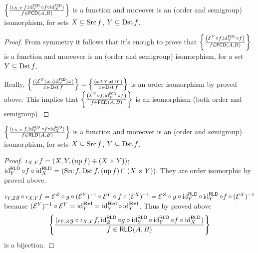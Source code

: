 \begin{prop}
  $\left\{ \frac{ (\iota_{X, Y} f , \operatorname{id}^{\mathsf{FCD}}_Y
  \circ f \circ \operatorname{id}^{\mathsf{FCD}}_X) }{
  f \in \mathsf{FCD} (A , B) }\right\}$ is a function and moreover is an
  (order and semigroup) isomorphism, for sets $X \subseteq \operatorname{Src} f$, $Y
  \subseteq \operatorname{Dst} f$.
\end{prop}

\begin{proof}
  From symmetry it follows that it's enough to prove that $\left\{ \frac{ \left(
  \mathcal{E}^Y \circ f , \operatorname{id}^{\mathsf{FCD}}_Y \circ f \right)
  }{ f \in \mathsf{FCD} (A , B) }\right\}$ is a
  function and moreover is an (order and semigroup) isomorphism, for a set $Y
  \subseteq \operatorname{Dst} f$.
  
  Really, $\left\{ \frac{ (\langle \mathcal{E}^Y \rangle x , \langle
  \operatorname{id}^{\mathsf{FCD}}_Y \rangle x) }{ x
  \in \operatorname{Dst} f }\right\} = \left\{ \frac{ (x \div Y , x \sqcap Y) }{
  x \in \operatorname{Dst} f }\right\}$ is an order isomorphism by proved
  above. This implies that $\left\{ \frac{ \left( \mathcal{E}^Y \circ f ,
  \operatorname{id}^{\mathsf{FCD}}_Y \circ f \right) }{
  f \in \mathsf{FCD} (A , B) }\right\}$ is an isomorphism
  (both order and semigroup).
\end{proof}

\begin{prop}
  $\left\{ \frac{ (\iota_{X, Y} f , \operatorname{id}^{\mathsf{RLD}}_Y \circ f \circ
  \operatorname{id}^{\mathsf{RLD}}_X) }{ f \in
  \mathsf{RLD} (A , B) }\right\}$ is a function and moreover is an
  (order and semigroup) isomorphism, for sets $X \subseteq \operatorname{Src} f$, $Y
  \subseteq \operatorname{Dst} f$.
\end{prop}

\begin{proof}
  $\iota_{X, Y} f = (X , Y , (\operatorname{up} f) \div (X \times Y))$;
  $\operatorname{id}^{\mathsf{RLD}}_Y \circ f \circ
  \operatorname{id}^{\mathsf{RLD}}_X = (\operatorname{Src} f , \operatorname{Dst} f ,
  (\operatorname{up} f) \sqcap (X \times Y))$. They are order isomorphic by proved
  above.
  
  $\iota_{Y, Z} g \circ \iota_{X, Y} f =\mathcal{E}^Z \circ g \circ
  (\mathcal{E}^Y)^{- 1} \circ \mathcal{E}^Y \circ f \circ (\mathcal{E}^X)^{-
  1} =\mathcal{E}^Z \circ g \circ \operatorname{id}^{\mathsf{RLD}}_Y \circ
  \operatorname{id}^{\mathsf{RLD}}_Y \circ f \circ (\mathcal{E}^X)^{- 1}$
  because $(\mathcal{E}^Y)^{- 1} \circ \mathcal{E}^Y =
  \operatorname{id}^{\mathbf{Rel}}_Y = \operatorname{id}^{\mathbf{Rel}}_Y
  \circ \operatorname{id}^{\mathbf{Rel}}_Y$. Thus by proved above
  \[ \left\{ \frac{ (\iota_{Y, Z} g \circ \iota_{X, Y} f ,
     \operatorname{id}^{\mathsf{RLD}}_Z \circ g \circ
     \operatorname{id}^{\mathsf{RLD}}_Y \circ \operatorname{id}^{\mathsf{RLD}}_Y
     \circ f \circ \operatorname{id}^{\mathsf{RLD}}_X) }{
     f \in \mathsf{RLD} (A , B) }\right\} \]
  is a bijection.
\end{proof}

